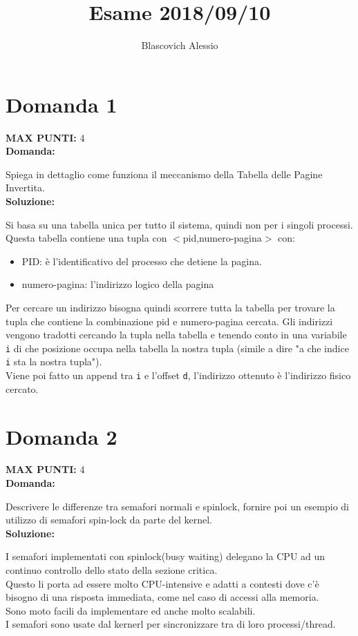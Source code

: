\documentclass{article}
\title{Esame 2018/09/10}
\author{Blascovich Alessio}
\date{}
\begin{document}
    \maketitle
    \section*{Domanda 1}
    \textbf{MAX PUNTI:} 4\\
    \textbf{Domanda:}


    Spiega in dettaglio come funziona il meccanismo della Tabella delle Pagine Invertita.\\
    \textbf{Soluzione:}


    Si basa su una tabella unica per tutto il sistema, quindi non per i singoli processi.\\
    Questa tabella contiene una tupla con $<$pid,numero-pagina$>$ con:
    \begin{itemize}
        \item PID: è l'identificativo del processo che detiene la pagina.
        \item numero-pagina: l'indirizzo logico della pagina
    \end{itemize}
    Per cercare un indirizzo bisogna quindi scorrere tutta la tabella per trovare la tupla che contiene la combinazione pid e numero-pagina cercata.
    Gli indirizzi vengono tradotti cercando la tupla nella tabella e tenendo conto in una variabile \verb+i+ di che posizione occupa nella tabella la nostra tupla (simile a dire "a che indice \verb+i+ sta la nostra tupla").\\
    Viene poi fatto un append tra \verb+i+ e l'offset \verb+d+, l'indirizzo ottenuto è l'indirizzo fisico cercato.
    \section*{Domanda 2}
    \textbf{MAX PUNTI:} 4\\
    \textbf{Domanda:}


    Descrivere le differenze tra semafori normali e spinlock, fornire poi un esempio di utilizzo di semafori spin-lock da parte del kernel.\\
    \textbf{Soluzione:}


    I semafori implementati con spinlock(busy waiting) delegano la CPU ad un continuo controllo dello stato della sezione critica.\\
    Questo li porta ad essere molto CPU-intensive e adatti a contesti dove c'è bisogno di una risposta immediata, come nel caso di accessi alla memoria.\\
    Sono moto facili da implementare ed anche molto scalabili.\\
    I semafori sono usate dal kernerl per sincronizzare tra di loro processi/thread.
\end{document}

